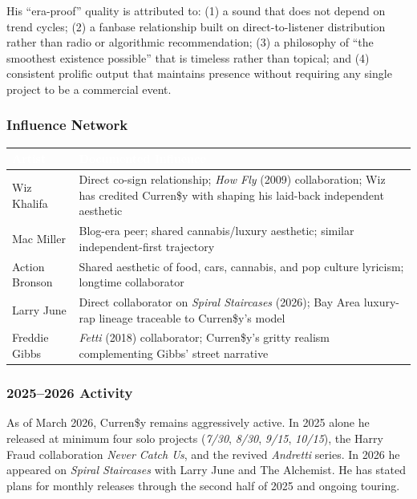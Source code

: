 \documentclass[11pt,letterpaper]{article}
\newcommand{\tableheader}[1]{\textbf{\sffamily\textcolor{white}{#1}}}
\begin{document}
His ``era-proof'' quality is attributed to: (1) a sound that does not depend on trend cycles; (2) a fanbase relationship built on direct-to-listener distribution rather than radio or algorithmic recommendation; (3) a philosophy of ``the smoothest existence possible'' that is timeless rather than topical; and (4) consistent prolific output that maintains presence without requiring any single project to be a commercial event.

\subsubsection{Influence Network}

\begin{center}
\begin{tabularx}{\textwidth}{L{3.5cm}X}
\toprule
{}
\tableheader{Artist} & \tableheader{Documented Influence} \\
\midrule
Wiz Khalifa & Direct co-sign relationship; \textit{How Fly} (2009) collaboration; Wiz has credited Curren\$y with shaping his laid-back independent aesthetic \\
Mac Miller & Blog-era peer; shared cannabis/luxury aesthetic; similar independent-first trajectory \\
Action Bronson & Shared aesthetic of food, cars, cannabis, and pop culture lyricism; longtime collaborator \\
Larry June & Direct collaborator on \textit{Spiral Staircases} (2026); Bay Area luxury-rap lineage traceable to Curren\$y's model \\
Freddie Gibbs & \textit{Fetti} (2018) collaborator; Curren\$y's gritty realism complementing Gibbs' street narrative \\
\bottomrule
\end{tabularx}
\end{center}

\subsubsection{2025–2026 Activity}

As of March 2026, Curren\$y remains aggressively active. In 2025 alone he released at minimum four solo projects (\textit{7/30}, \textit{8/30}, \textit{9/15}, \textit{10/15}), the Harry Fraud collaboration \textit{Never Catch Us}, and the revived \textit{Andretti} series. In 2026 he appeared on \textit{Spiral Staircases} with Larry June and The Alchemist. He has stated plans for monthly releases through the second half of 2025 and ongoing touring.
\end{document}

